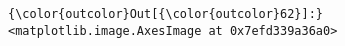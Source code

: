\documentclass[11pt]{article}
\begin{document}
\begin{Verbatim}[commandchars=\\\{\}]
{\color{outcolor}Out[{\color{outcolor}62}]:} <matplotlib.image.AxesImage at 0x7efd339a36a0>
\end{Verbatim}
            
    \begin{center}
    \end{center}
    { \hspace*{\fill} \\}
    

    
    
    
    
\end{document}
